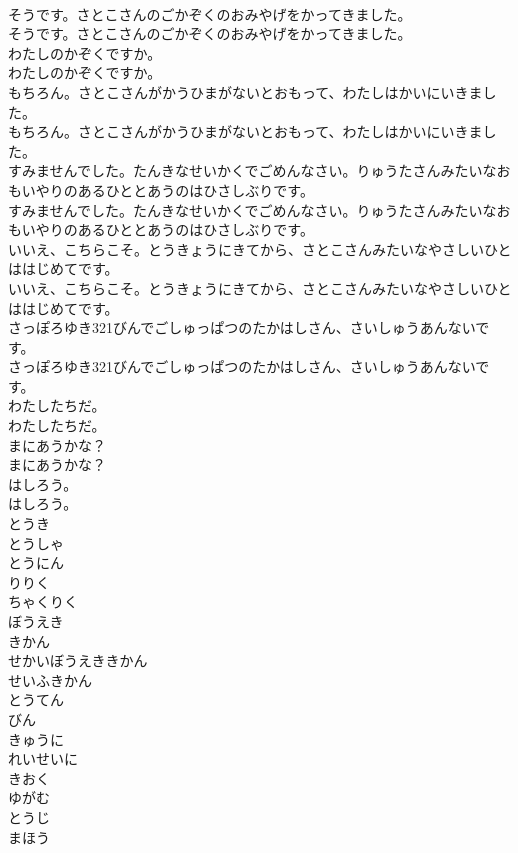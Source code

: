 \documentclass[8pt]{extreport}
\begin{document}
\begin{CJK}{UTF8}{min}
\\	そうです。さとこさんのごかぞくのおみやげをかってきました。
\\	そうです。さとこさんのごかぞくのおみやげをかってきました。
\\	わたしのかぞくですか。
\\	わたしのかぞくですか。
\\	もちろん。さとこさんがかうひまがないとおもって、わたしはかいにいきました。
\\	もちろん。さとこさんがかうひまがないとおもって、わたしはかいにいきました。
\\	すみませんでした。たんきなせいかくでごめんなさい。りゅうたさんみたいなおもいやりのあるひととあうのはひさしぶりです。
\\	すみませんでした。たんきなせいかくでごめんなさい。りゅうたさんみたいなおもいやりのあるひととあうのはひさしぶりです。
\\	いいえ、こちらこそ。とうきょうにきてから、さとこさんみたいなやさしいひとははじめてです。
\\	いいえ、こちらこそ。とうきょうにきてから、さとこさんみたいなやさしいひとははじめてです。
\\	さっぽろゆき321びんでごしゅっぱつのたかはしさん、さいしゅうあんないです。
\\	さっぽろゆき321びんでごしゅっぱつのたかはしさん、さいしゅうあんないです。
\\	わたしたちだ。
\\	わたしたちだ。
\\	まにあうかな？
\\	まにあうかな？
\\	はしろう。
\\	はしろう。
\\	とうき
\\	とうしゃ
\\	とうにん
\\	りりく
\\	ちゃくりく
\\	ぼうえき
\\	きかん
\\	せかいぼうえききかん
\\	せいふきかん
\\	とうてん
\\	びん
\\	きゅうに
\\	れいせいに
\\	きおく
\\	ゆがむ
\\	とうじ
\\	まほう

\end{CJK}
\end{document}
